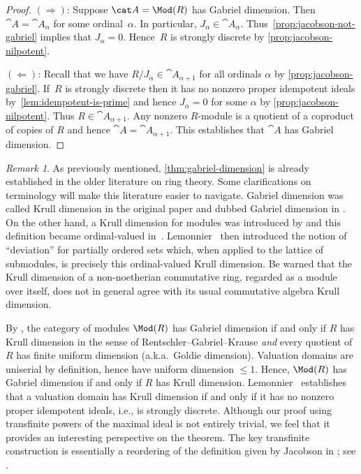 \documentclass{amsart}
\numberwithin{equation}{section}%
\theoremstyle{remark}
\newtheorem{Rem}[equation]{Remark}
\begin{document}
\begin{proof}
	$(\Rightarrow)$: Suppose $\cat A=\Mod(R)$ has Gabriel dimension. Then $\cat A=\cat A_\alpha$ for some ordinal~$\alpha$. In particular, $J_\alpha \in \cat A_\alpha$. Thus~\cref{prop:jacobson-not-gabriel} implies that $J_\alpha = 0$. Hence~$R$ is strongly discrete by \cref{prop:jacobson-nilpotent}.

	$(\Leftarrow)$: Recall that we have $R/J_\alpha \in \cat A_{\alpha+1}$ for all ordinals $\alpha$ by \cref{prop:jacobson-gabriel}. If~$R$ is strongly discrete then it has no nonzero proper idempotent ideals by~\cref{lem:idempotent-is-prime} and hence $J_\alpha=0$ for some $\alpha$ by \cref{prop:jacobson-nilpotent}. Thus $R \in \cat A_{\alpha+1}$. Any nonzero $R$-module is a quotient of a coproduct of copies of $R$ and hence $\cat A=\cat A_{\alpha+1}$. This establishes that $\cat A$ has Gabriel dimension.
\end{proof}

\begin{Rem}\label{rem:classical}
As previously mentioned, \cref{thm:gabriel-dimension} is already established in the older literature on ring theory. Some clarifications on terminology will make this literature easier to navigate. Gabriel dimension was called Krull dimension in the original paper \cite{Gabriel62} and dubbed Gabriel dimension in \cite{GordonRobson74}. On the other hand, a Krull dimension for modules was introduced by \cite{RentschlerGabriel67} and this definition became ordinal-valued in~\cite{Krause70}. Lemonnier~\cite{Lemonnier72} then introduced the notion of ``deviation'' for partially ordered sets which, when applied to the lattice of submodules, is precisely this ordinal-valued Krull dimension. Be warned that the Krull dimension of a non-noetherian commutative ring, regarded as a module over itself, does not in general agree with its usual commutative algebra Krull dimension.

By \cite[Lemma~1.3(ii), Corollary~2.2 and Theorem~2.5]{GordonRobson74}, the category of modules $\Mod(R)$ has Gabriel dimension if and only if $R$ has Krull dimension in the sense of Rentschler--Gabriel--Krause \emph{and} every quotient of $R$ has finite uniform dimension (a.k.a.~Goldie dimension). Valuation domains are uniserial by definition, hence have uniform dimension $\le 1$. Hence, $\Mod(R)$ has Gabriel dimension if and only if $R$ has Krull dimension. Lemonnier~\cite[Proposition~4]{Lemonnier77} establishes that a valuation domain has Krull dimension if and only if it has no nonzero proper idempotent ideals, i.e., is strongly discrete. Although our proof using transfinite powers of the maximal ideal is not entirely trivial, we feel that it provides an interesting perspective on the theorem. The key transfinite construction is essentially a reordering of the definition given by Jacobson in \cite[Page~306]{Jacobson45}; see \cite{KrauseLenagan79}.
\end{Rem}



\end{document}
